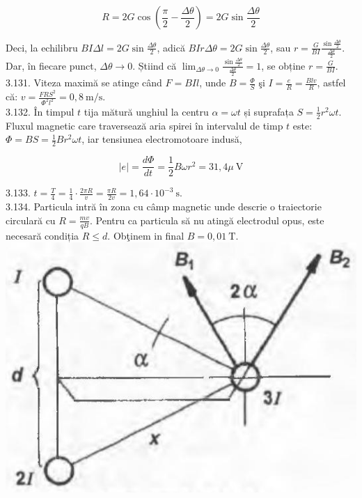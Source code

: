 \documentclass[10pt]{article}
\begin{document}
$$
R=2 G \cos \left(\frac{\pi}{2}-\frac{\Delta \theta}{2}\right)=2 G \sin \frac{\Delta \theta}{2}
$$

Deci, la echilibru $B I \Delta l=2 G \sin \frac{\Delta \theta}{2}$, adică $B I r \Delta \theta=2 G \sin \frac{\Delta \theta}{2}$, sau $r=\frac{G}{B I} \frac{\sin \frac{\Delta \theta}{2}}{\frac{\Delta \theta}{2}}$.\\
Dar, în fiecare punct, $\Delta \theta \rightarrow 0$. Știind că $\lim _{\Delta \theta \rightarrow 0} \frac{\sin \frac{\Delta \theta}{2}}{\frac{\Delta \theta}{2}}=1$, se obține $r=\frac{G}{B I}$.\\
3.131. Viteza maximă se atinge când $F=B I l$, unde $B=\frac{\Phi}{S}$ şi $I=\frac{e}{R}=\frac{B l v}{R}$, astfel că: $v=\frac{F R S^{2}}{\Phi^{2} l^{2}}=0,8 \mathrm{~m} / \mathrm{s}$.\\
3.132. În timpul $t$ tija mătură unghiul la centru $\alpha=\omega t$ și suprafața $S=\frac{1}{2} r^{2} \omega t$. Fluxul magnetic care traversează aria spirei în intervalul de timp $t$ este: $\Phi=B S=\frac{1}{2} B r^{2} \omega t$, iar tensiunea electromotoare indusă,

$$
|e|=\frac{d \Phi}{d t}=\frac{1}{2} B \omega r^{2}=31,4 \mu \mathrm{~V}
$$

3.133. $t=\frac{T}{4}=\frac{1}{4} \cdot \frac{2 \pi R}{v}=\frac{\pi R}{2 v}=1,64 \cdot 10^{-3} \mathrm{~s}$.\\
3.134. Particula intră în zona cu câmp magnetic unde descrie o traiectorie circulară cu $R=\frac{m v}{q B}$. Pentru ca particula să nu atingă electrodul opus, este necesară condiția $R \leq d$. Obţinem in final $B=0,01 \mathrm{~T}$.\\
\includegraphics[max width=\textwidth, center]{2025_07_01_5b3ff9fa0d508c8e9f17g-367}
\end{document}

